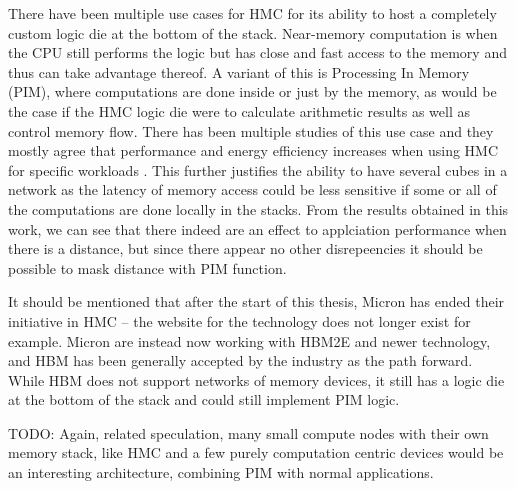 There have been multiple use cases for HMC for its ability to host a completely custom logic die at the bottom of the stack. Near-memory computation is when the CPU still performs the logic but has close and fast access to the memory and thus can take advantage thereof. A variant of this is Processing In Memory (PIM), where computations are done inside or just by the memory, as would be the case if the HMC logic die were to calculate arithmetic results as well as control memory flow. There has been multiple studies of this use case and they mostly agree that performance and energy efficiency increases when using HMC for specific workloads \cite{7917248, Min:2019:NEH:3287624.3287642, 7804052, oliveira2017nim}. This further justifies the ability to have several cubes in a network as the latency of memory access could be less sensitive if some or all of the computations are done locally in the stacks. From the results obtained in this work, we can see that there indeed are an effect to applciation performance when there is a distance, but since there appear no other disrepeencies it should be possible to mask distance with PIM function. 
\bigskip

It should be mentioned that after the start of this thesis, Micron has ended their initiative in HMC -- the website for the technology does not longer exist for example. Micron are instead now working with HBM2E and newer technology, and HBM has been generally accepted by the industry as the path forward. While HBM does not support networks of memory devices, it still has a logic die at the bottom of the stack and could still implement PIM logic.

TODO: Again, related speculation, many small compute nodes with their own memory stack, like HMC and a few purely computation centric devices would be an interesting architecture, combining PIM with normal applications.
